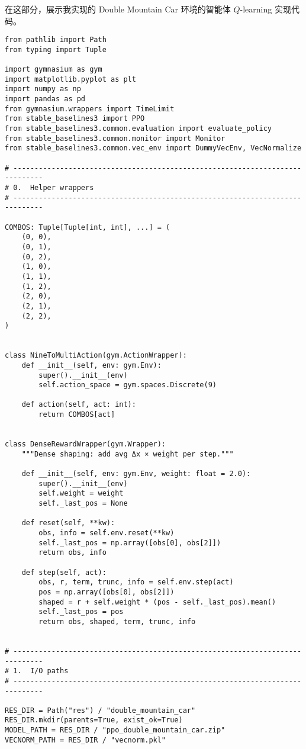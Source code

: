 在这部分，展示我实现的 Double Mountain Car 环境的智能体 \(Q\)-learning 实现代码。

\begin{verbatim}
from pathlib import Path
from typing import Tuple

import gymnasium as gym
import matplotlib.pyplot as plt
import numpy as np
import pandas as pd
from gymnasium.wrappers import TimeLimit
from stable_baselines3 import PPO
from stable_baselines3.common.evaluation import evaluate_policy
from stable_baselines3.common.monitor import Monitor
from stable_baselines3.common.vec_env import DummyVecEnv, VecNormalize

# -----------------------------------------------------------------------------
# 0.  Helper wrappers
# -----------------------------------------------------------------------------

COMBOS: Tuple[Tuple[int, int], ...] = (
    (0, 0),
    (0, 1),
    (0, 2),
    (1, 0),
    (1, 1),
    (1, 2),
    (2, 0),
    (2, 1),
    (2, 2),
)


class NineToMultiAction(gym.ActionWrapper):
    def __init__(self, env: gym.Env):
        super().__init__(env)
        self.action_space = gym.spaces.Discrete(9)

    def action(self, act: int):
        return COMBOS[act]


class DenseRewardWrapper(gym.Wrapper):
    """Dense shaping: add avg Δx × weight per step."""

    def __init__(self, env: gym.Env, weight: float = 2.0):
        super().__init__(env)
        self.weight = weight
        self._last_pos = None

    def reset(self, **kw):
        obs, info = self.env.reset(**kw)
        self._last_pos = np.array([obs[0], obs[2]])
        return obs, info

    def step(self, act):
        obs, r, term, trunc, info = self.env.step(act)
        pos = np.array([obs[0], obs[2]])
        shaped = r + self.weight * (pos - self._last_pos).mean()
        self._last_pos = pos
        return obs, shaped, term, trunc, info


# -----------------------------------------------------------------------------
# 1.  I/O paths
# -----------------------------------------------------------------------------

RES_DIR = Path("res") / "double_mountain_car"
RES_DIR.mkdir(parents=True, exist_ok=True)
MODEL_PATH = RES_DIR / "ppo_double_mountain_car.zip"
VECNORM_PATH = RES_DIR / "vecnorm.pkl"


\end{verbatim}

